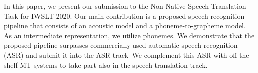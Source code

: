 In this paper, we present our submission to the Non-Native Speech Translation Task for IWSLT 2020. Our main contribution is a proposed speech recognition pipeline that consists of an acoustic model and a phoneme-to-grapheme model. As an intermediate representation, we utilize phonemes. We demonstrate that the proposed pipeline surpasses commercially used automatic speech recognition (ASR) and submit it into the ASR track. We complement this ASR with off-the-shelf MT systems to take part also in the speech translation track.
